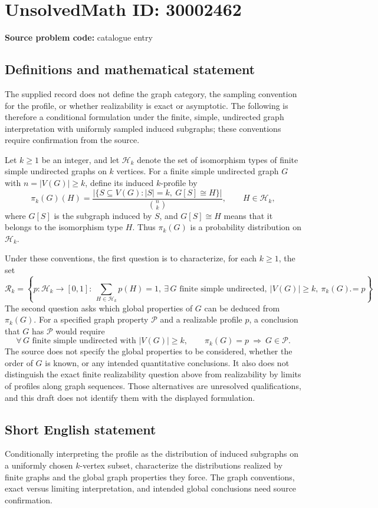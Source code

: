 \documentclass[11pt]{article}
\begin{document}
\section*{UnsolvedMath ID: 30002462}
\textbf{Source problem code:} catalogue entry
\subsection{Definitions and mathematical statement}
The supplied record does not define the graph category, the sampling convention for the profile, or whether realizability is exact or asymptotic. The following is therefore a conditional formulation under the finite, simple, undirected graph interpretation with uniformly sampled induced subgraphs; these conventions require confirmation from the source.

Let \(k\geq 1\) be an integer, and let \(\mathcal H_k\) denote the set of isomorphism types of finite simple undirected graphs on \(k\) vertices. For a finite simple undirected graph \(G\) with \(n=|V(G)|\geq k\), define its induced \(k\)-profile by
\[
\pi_k(G)(H)=\frac{\bigl|\{S\subseteq V(G): |S|=k,\ G[S]\cong H\}\bigr|}{\binom{n}{k}},\qquad H\in\mathcal H_k,
\]
where \(G[S]\) is the subgraph induced by \(S\), and \(G[S]\cong H\) means that it belongs to the isomorphism type \(H\). Thus \(\pi_k(G)\) is a probability distribution on \(\mathcal H_k\).

Under these conventions, the first question is to characterize, for each \(k\geq 1\), the set
\[
\mathcal R_k=\left\{p:\mathcal H_k\to[0,1]:\ \sum_{H\in\mathcal H_k}p(H)=1,\ \exists\,G\text{ finite simple undirected},\ |V(G)|\geq k,\ \pi_k(G)=p\right\}.
\]
The second question asks which global properties of \(G\) can be deduced from \(\pi_k(G)\). For a specified graph property \(\mathcal P\) and a realizable profile \(p\), a conclusion that \(G\) has \(\mathcal P\) would require
\[
\forall\,G\text{ finite simple undirected with }|V(G)|\geq k,\qquad \pi_k(G)=p\ \Longrightarrow\ G\in\mathcal P.
\]
The source does not specify the global properties to be considered, whether the order of \(G\) is known, or any intended quantitative conclusions. It also does not distinguish the exact finite realizability question above from realizability by limits of profiles along graph sequences. Those alternatives are unresolved qualifications, and this draft does not identify them with the displayed formulation.
\subsection{Short English statement}
Conditionally interpreting the profile as the distribution of induced subgraphs on a uniformly chosen \(k\)-vertex subset, characterize the distributions realized by finite graphs and the global graph properties they force. The graph conventions, exact versus limiting interpretation, and intended global conclusions need source confirmation.
\end{document}
